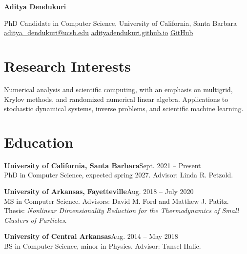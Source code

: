 \documentclass[11pt,letterpaper]{article}
\begin{document}
\thispagestyle{plain}
{\LARGE\bfseries Aditya Dendukuri}\par
PhD Candidate in Computer Science, University of California, Santa Barbara\\
\href{mailto:aditya_dendukuri@ucsb.edu}{aditya\_dendukuri@ucsb.edu}\quad
\href{https://adityadendukuri.github.io/}{adityadendukuri.github.io}\quad
\href{https://github.com/AdityaDendukuri}{GitHub}

\section*{Research Interests}
Numerical analysis and scientific computing, with an emphasis on multigrid, Krylov methods, and
randomized numerical linear algebra. Applications to stochastic dynamical systems, inverse problems,
and scientific machine learning.

\section*{Education}
\textbf{University of California, Santa Barbara}\hfill Sept. 2021 -- Present\\
PhD in Computer Science, expected spring 2027. Advisor: Linda R. Petzold.

\textbf{University of Arkansas, Fayetteville}\hfill Aug. 2018 -- July 2020\\
MS in Computer Science. Advisors: David M. Ford and Matthew J. Patitz.\\
Thesis: \textit{Nonlinear Dimensionality Reduction for the Thermodynamics of Small Clusters of Particles}.

\textbf{University of Central Arkansas}\hfill Aug. 2014 -- May 2018\\
BS in Computer Science, minor in Physics. Advisor: Tansel Halic.
\end{document}
